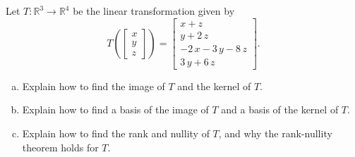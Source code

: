 
\begin{exerciseStatement}
 Let \(T:\mathbb{R}^ 3  \to \mathbb{R}^ 4 \) be the linear transformation given by \[T\left(  \left[\begin{array}{c}
x \\
y \\
z
\end{array}\right]  \right) =  \left[\begin{array}{c}
x + z \\
y + 2 \, z \\
-2 \, x - 3 \, y - 8 \, z \\
3 \, y + 6 \, z
\end{array}\right] .\]
\begin{enumerate}[(a)]
\item Explain how to find the image of \(T\) and the kernel of \(T\).
\item Explain how to find a basis of the image of \(T\) and a basis of the kernel of \(T\).
\item Explain how to find the rank and nullity of \(T\), and why the rank-nullity theorem holds for \(T\).
\end{enumerate}
    
\end{exerciseStatement}
    
